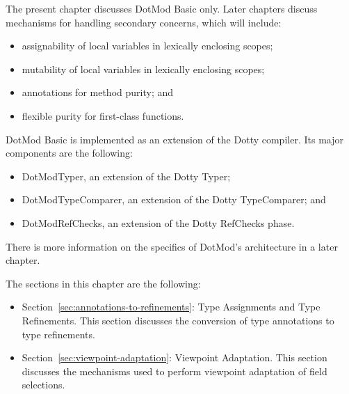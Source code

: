 \documentclass[11pt]{report}
\begin{document}
The present chapter discusses DotMod Basic only. Later chapters discuss mechanisms for handling secondary concerns, which will include:
\begin{itemize}
\item assignability of local variables in lexically enclosing scopes;
\item mutability of local variables in lexically enclosing scopes;
\item annotations for method purity; and
\item flexible purity for first-class functions.
\end{itemize}

DotMod Basic is implemented as an extension of the Dotty compiler. Its major components are the following:
\begin{itemize}
\item DotModTyper, an extension of the Dotty Typer;
\item DotModTypeComparer, an extension of the Dotty TypeComparer; and
\item DotModRefChecks, an extension of the Dotty RefChecks phase.
\end{itemize}
There is more information on the specifics of DotMod's architecture in a later chapter.

The sections in this chapter are the following:
\begin{itemize}
\item Section~\ref{sec:annotations-to-refinements}: Type Assignments and Type Refinements. This section discusses the conversion of type annotations to type refinements.
\item Section~\ref{sec:viewpoint-adaptation}: Viewpoint Adaptation. This section discusses the mechanisms used to perform viewpoint adaptation of field selections.
\end{itemize}





\begin{comment} TODO: move to introduction
The objective of DotMod Basic is to show how mutability information can be integrated into the standard Dotty type system.

The integrated approach is unusual. It is much more common in the side-effect-limitation domain to propose secondary type systems that are entirely orthogonal to the host language's primary type system. Although orthogonality is a nice property, the development and formalization of an entire secondary type system is a substantial amount of work.

The Checker Framework for Java can help reduce the effort required to implement a secondary type system. 

However, there does not seem


\end{comment}
\end{document}
